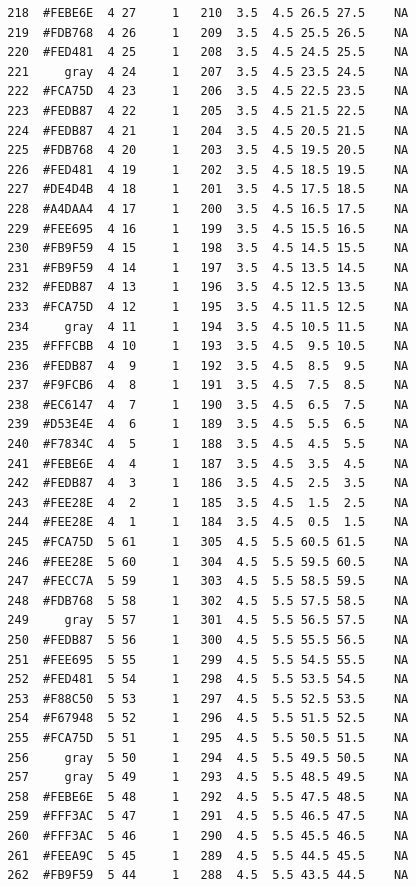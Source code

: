\documentclass[12pt,twoside]{reedthesis}
\begin{document}
\begin{verbatim}
  218  #FEBE6E  4 27     1   210  3.5  4.5 26.5 27.5    NA
  219  #FDB768  4 26     1   209  3.5  4.5 25.5 26.5    NA
  220  #FED481  4 25     1   208  3.5  4.5 24.5 25.5    NA
  221     gray  4 24     1   207  3.5  4.5 23.5 24.5    NA
  222  #FCA75D  4 23     1   206  3.5  4.5 22.5 23.5    NA
  223  #FEDB87  4 22     1   205  3.5  4.5 21.5 22.5    NA
  224  #FEDB87  4 21     1   204  3.5  4.5 20.5 21.5    NA
  225  #FDB768  4 20     1   203  3.5  4.5 19.5 20.5    NA
  226  #FED481  4 19     1   202  3.5  4.5 18.5 19.5    NA
  227  #DE4D4B  4 18     1   201  3.5  4.5 17.5 18.5    NA
  228  #A4DAA4  4 17     1   200  3.5  4.5 16.5 17.5    NA
  229  #FEE695  4 16     1   199  3.5  4.5 15.5 16.5    NA
  230  #FB9F59  4 15     1   198  3.5  4.5 14.5 15.5    NA
  231  #FB9F59  4 14     1   197  3.5  4.5 13.5 14.5    NA
  232  #FEDB87  4 13     1   196  3.5  4.5 12.5 13.5    NA
  233  #FCA75D  4 12     1   195  3.5  4.5 11.5 12.5    NA
  234     gray  4 11     1   194  3.5  4.5 10.5 11.5    NA
  235  #FFFCBB  4 10     1   193  3.5  4.5  9.5 10.5    NA
  236  #FEDB87  4  9     1   192  3.5  4.5  8.5  9.5    NA
  237  #F9FCB6  4  8     1   191  3.5  4.5  7.5  8.5    NA
  238  #EC6147  4  7     1   190  3.5  4.5  6.5  7.5    NA
  239  #D53E4E  4  6     1   189  3.5  4.5  5.5  6.5    NA
  240  #F7834C  4  5     1   188  3.5  4.5  4.5  5.5    NA
  241  #FEBE6E  4  4     1   187  3.5  4.5  3.5  4.5    NA
  242  #FEDB87  4  3     1   186  3.5  4.5  2.5  3.5    NA
  243  #FEE28E  4  2     1   185  3.5  4.5  1.5  2.5    NA
  244  #FEE28E  4  1     1   184  3.5  4.5  0.5  1.5    NA
  245  #FCA75D  5 61     1   305  4.5  5.5 60.5 61.5    NA
  246  #FEE28E  5 60     1   304  4.5  5.5 59.5 60.5    NA
  247  #FECC7A  5 59     1   303  4.5  5.5 58.5 59.5    NA
  248  #FDB768  5 58     1   302  4.5  5.5 57.5 58.5    NA
  249     gray  5 57     1   301  4.5  5.5 56.5 57.5    NA
  250  #FEDB87  5 56     1   300  4.5  5.5 55.5 56.5    NA
  251  #FEE695  5 55     1   299  4.5  5.5 54.5 55.5    NA
  252  #FED481  5 54     1   298  4.5  5.5 53.5 54.5    NA
  253  #F88C50  5 53     1   297  4.5  5.5 52.5 53.5    NA
  254  #F67948  5 52     1   296  4.5  5.5 51.5 52.5    NA
  255  #FCA75D  5 51     1   295  4.5  5.5 50.5 51.5    NA
  256     gray  5 50     1   294  4.5  5.5 49.5 50.5    NA
  257     gray  5 49     1   293  4.5  5.5 48.5 49.5    NA
  258  #FEBE6E  5 48     1   292  4.5  5.5 47.5 48.5    NA
  259  #FFF3AC  5 47     1   291  4.5  5.5 46.5 47.5    NA
  260  #FFF3AC  5 46     1   290  4.5  5.5 45.5 46.5    NA
  261  #FEEA9C  5 45     1   289  4.5  5.5 44.5 45.5    NA
  262  #FB9F59  5 44     1   288  4.5  5.5 43.5 44.5    NA

\end{verbatim}
\end{document}
